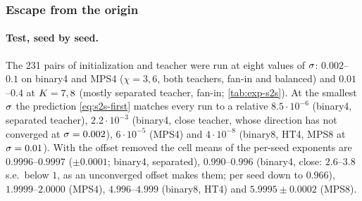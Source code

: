 \subsubsection{Escape from the origin}\label{app:supp-s2s-escape}

\paragraph{Test, seed by seed.}
\empirical{} The 231 pairs of initialization and teacher were run at eight values of $\sigma$: $0.002$--$0.1$ on
binary4 and MPS4 ($\chi=3,6$, both teachers, fan-in and balanced) and $0.01$--$0.4$ at $K=7,8$ (mostly separated
teacher, fan-in; \cref{tab:exp-s2s}). At the smallest $\sigma$ the prediction \eqref{eq:s2s-first} matches every run to
a relative $8.5\cdot10^{-6}$ (binary4, separated teacher), $2.2\cdot10^{-3}$ (binary4, close teacher, whose direction
has not converged at $\sigma=0.002$), $6\cdot10^{-5}$ (MPS4) and $4\cdot10^{-8}$ (binary8, HT4, MPS8 at $\sigma=0.01$).
With the offset removed the cell means of the per-seed exponents are $0.9996$--$0.9997$ ($\pm0.0001$; binary4,
separated), $0.990$--$0.996$ (binary4, close: $2.6$--$3.8$ s.e.\ below $1$, as an unconverged offset makes them; per
seed down to $0.966$),
$1.9999$--$2.0000$ (MPS4), $4.996$--$4.999$ (binary8, HT4) and $5.9995\pm0.0002$ (MPS8).

